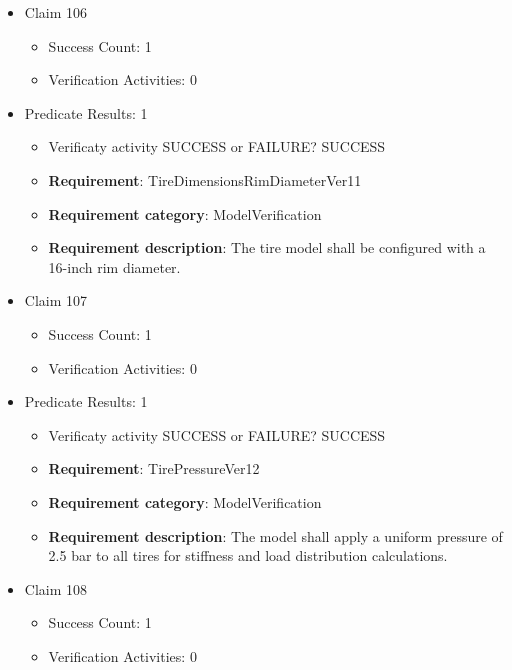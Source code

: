 \documentclass{article}
\begin{document}
\begin{itemize}
  				  \item Claim 106
				\begin{itemize}
			    	\item Success Count: 1 
			    	\item Verification Activities: 0
				\end{itemize}
				
									    
				\item Predicate Results: 1
					\begin{itemize}				
					\item Verificaty activity SUCCESS or FAILURE? SUCCESS
					
					\item \textbf{Requirement}: TireDimensionsRimDiameterVer11 
					\item \textbf{Requirement category}: ModelVerification
					\item \textbf{Requirement description}: The tire model shall be configured with a 16-inch rim diameter.
					\end{itemize}

  				  \item Claim 107
				\begin{itemize}
			    	\item Success Count: 1 
			    	\item Verification Activities: 0
				\end{itemize}
				
									    
				\item Predicate Results: 1
					\begin{itemize}				
					\item Verificaty activity SUCCESS or FAILURE? SUCCESS
					
					\item \textbf{Requirement}: TirePressureVer12 
					\item \textbf{Requirement category}: ModelVerification
					\item \textbf{Requirement description}: The model shall apply a uniform pressure of 2.5 bar to all tires for stiffness and load distribution calculations.
					\end{itemize}

  				  \item Claim 108
				\begin{itemize}
			    	\item Success Count: 1 
			    	\item Verification Activities: 0
				\end{itemize}
				

\end{itemize}
\end{document}
